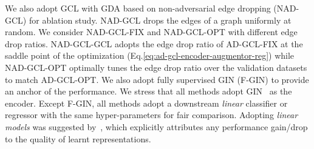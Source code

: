 We also adopt GCL with GDA based on non-adversarial edge dropping (NAD-GCL) for ablation study. NAD-GCL drops the edges of a graph uniformly at random. We consider NAD-GCL-FIX and NAD-GCL-OPT with different edge drop ratios. NAD-GCL-GCL adopts the edge drop ratio of AD-GCL-FIX at the saddle point of the optimization (Eq.\ref{eq:ad-gcl-encoder-augmentor-reg}) while NAD-GCL-OPT optimally tunes the edge drop ratio over the validation datasets to match AD-GCL-OPT.
We also adopt fully supervised GIN (F-GIN) to provide an anchor of the performance. We stress that all methods adopt GIN~\cite{xu2018how} as the encoder. Except F-GIN, all methods adopt a downstream \emph{linear} classifier or regressor with the same hyper-parameters for fair comparison. Adopting \emph{linear models} was suggested by~\cite{tschannen2019mutual}, which explicitly attributes any performance gain/drop to the quality of learnt representations.  

